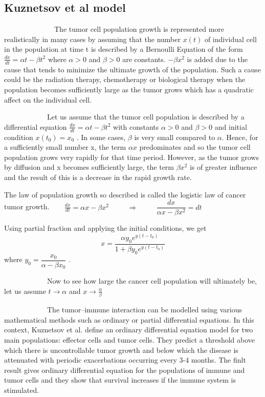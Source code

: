 \subsection{Kuznetsov et al model}

\par ~~~~~~~~~~~~~~The tumor cell population growth is represented more realistically in many cases by assuming that the number $x(t)$ of individual cell in the population at time t is described by a Bernoulli Equation of the form $ \frac{dx}{dt}=\alpha t-\beta t^{2} $ where $ \alpha >0$ and $ \beta >0 $ are constants.    
$- \beta x^{2} $ is added due to the cause that tends to minimize the ultimate growth of the population. Such a cause could be the radiation therapy, chemotherapy or biological therapy when the population becomes sufficiently large as the tumor grows which has a quadratic affect on the individual cell. 

\par ~~~~~~~~~~~~Let us assume that the tumor cell population is described by a differential equation $ \frac{dx}{dt}=\alpha t-\beta t^{2} $  with constants  $ \alpha >0$ and $ \beta >0 $ and initial condition $ x(t_{0})=x_{0} $ .
 In some cases, $\beta $ is very small compared to $\alpha $. Hence, for a sufficiently small number x, the term $\alpha x $ predominates and so the tumor cell population grows very rapidly for that time period. However, as the tumor grows by diffusion and x becomes sufficiently large, the term $ \beta x^{2} $ is of greater influence and the result of this is a decrease in the rapid growth rate.
 
The law of population growth so described is called the logistic law of cancer tumor growth. 
 $ ~~~~~~~~\frac{dx}{dt}=\alpha x-\beta x^{2} $ $~~~~~~~~~~\Rightarrow $ 
$~~~~~~~~~~ \dfrac{dx}{\alpha x-\beta x^{2}}=dt $ 

Using partial fraction and applying the initial conditions, we get
$$ x=\dfrac{\alpha y_{0} e^{y(t-t_{0})}}{1+\beta y_{0} e^{y(t-t_{0})}} $$ 
where $ y_{0}= \dfrac{x_{0}}{\alpha -\beta x_{0}} $ .

\par ~~~~~~~~~~~~Now to see how large the cancer cell population will ultimately be, let us assume $ t\rightarrow \alpha $ and $ x\rightarrow \frac{\alpha}{\beta} $
%
%  
  
\par ~~~~~~~~~~~~The tumor–immune interaction can be modelled using various mathematical methods such as ordinary or partial differential equations. In this context, Kuznetsov et al.  define an ordinary differential equation model for two main populations: effector cells and tumor cells. They predict a threshold above which there is uncontrollable tumor growth and below which the disease is attenuated with periodic exacerbations occurring every 3-4 months. The finlt result gives ordinary differential equation for the populations of immune and tumor cells and they show that survival increases if the immune system is stimulated.  

